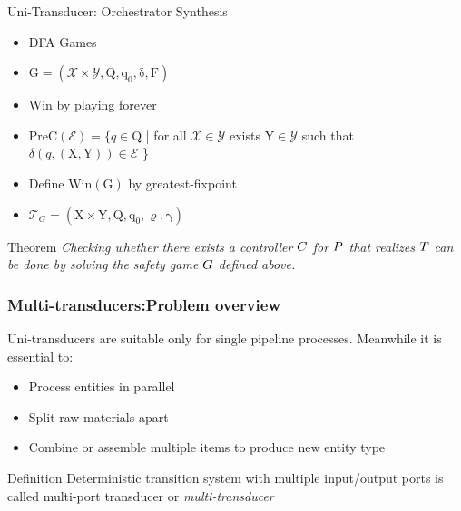 \documentclass{beamer}
\theoremstyle{definition}
\theoremstyle{plain}
\begin{document}
\begin{frame}{Uni-Transducer: Orchestrator Synthesis}
\begin{itemize}
    \item DFA Games
    \item $\mathrm{G} = (\mathcal{X} \times \mathcal{Y},\mathrm{Q,q_{0},\delta, F})$
    \item Win by playing forever
    \item $\mathrm{PreC}(\mathcal{E}) = \{q \in \mathrm{Q}$ | for all $\mathcal{X} \in \mathcal{Y}$ exists $\mathrm{Y} \in \mathcal{Y}$ such that $\delta(q, (\mathrm{X,Y})) \in \mathcal{E}$ \}
    \item Define $\mathrm{Win(G)}$ by greatest-fixpoint
    \item $\mathcal{T}_{G} = (\mathrm{X \times Y, Q, q_{0}, \varrho, \gamma})$
\end{itemize}
\begin{alertblock}{Theorem}
\textit{Checking whether there exists a controller $\mathnormal{C}$
for $\mathnormal{P}$ that realizes $\mathnormal{T}$ can be done by solving the safety game
$\mathnormal{G}$ defined above.}
\end{alertblock}
    
\end{frame}

\begin{frame}
\frametitle{Multi-transducers:Problem overview}
Uni-transducers are suitable only for  single pipeline processes.
Meanwhile it is essential to:
\begin{itemize}
\item Process entities in parallel
\item Split raw materials apart
\item Combine or assemble multiple items  to produce new entity type
\end{itemize}

\begin{block}{Definition}
Deterministic transition system with multiple input/output ports is called multi-port transducer or \textit{multi-transducer}
\end{block}
\end{frame}
\end{document}
